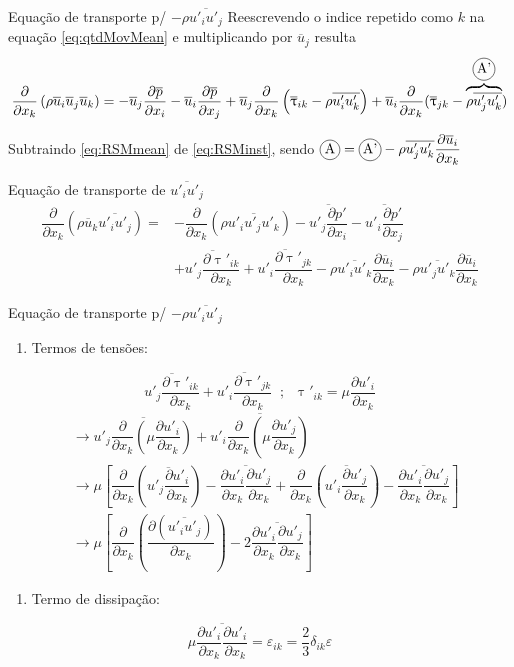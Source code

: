 \documentclass[10pt]{beamer}
\newcommand{\ddx}[2]{\dfrac{\partial #1}{\partial x_{#2}}}
\newcommand{\ddxp}[2]{\dfrac{\partial }{\partial x_{#2}}\left(#1\right)}
\newcommand{\m}[1]{\overline{#1}}
\newcommand{\incircle}[1]{{\tikz[baseline=(X.base)] \node(X)[draw, shape=circle, inner sep=0]{\strut #1};}}
\begin{document}
\begin{frame}{Equação de transporte p/ $ -\rho \m{u'_i u'_j} $}
	Reescrevendo o indice repetido como $k$ na equação \ref{eq:qtdMovMean} e multiplicando por $ \m{u}_j $ resulta
	\begin{equation}\label{eq:RSMmean}
	\ddxp{\rho \m{u}_i \m{u}_j \m{u}_k}{k} = - \m{u}_j \ddx{\m{p}}{i} - \m{u}_i \ddx{\m{p}}{j} + \m{u}_j \ddxp{\m{\uptau}_{ik} - \rho\m{u'_iu'_k}}{k} + \m{u}_i \ddx{}{k}(\m{\uptau}_{jk} - \overbrace{\rho\m{u'_ju'_k}}^{\incircle{A'}})
	\end{equation}
	
	Subtraindo \ref{eq:RSMmean} de \ref{eq:RSMinst}, sendo $\incircle{A} = \incircle{A'} - \rho \m{u'_ju'_k}\ddx{\m{u}_i}{k}$
	
	\begin{block}{Equação de transporte de $ \m{u'_i u'_j} $}
		\begin{align}\label{eq:uiuj}
	\ddxp{\rho \m{u}_k \m{u'_i u'_j}}{k} = &- \ddxp{\rho \m{u'_iu'_ju'_k}}{k} - \m{u'_j\ddx{p'}{i}} - \m{u'_i\ddx{p'}{j}} \nonumber \\
	&+ \m{u'_j\ddx{\uptau'_{ik}}{k}} + \m{u'_i\ddx{\uptau'_{jk}}{k}}
	- \rho \m{u'_i u'_k} \ddx{\m{u}_i}{k} - \rho \m{u'_j u'_k} \ddx{\m{u}_i}{k} 
	\end{align}
	\end{block}
		
\end{frame}

\begin{frame}{Equação de transporte p/ $ -\rho \m{u'_i u'_j} $}
	
	\begin{enumerate}[$\bullet$]
		\item Termos de tensões:
	\end{enumerate}
	
	\begin{equation*}
	\m{u'_j\ddx{\uptau'_{ik}}{k}} + \m{u'_i\ddx{\uptau'_{jk}}{k}} \;\;;\;\; \uptau'_{ik} = \mu \ddx{u'_i}{k}
	\end{equation*}
	\begin{align*}
	&\rightarrow \m{u'_j\ddxp{\mu \ddx{u'_i}{k}}{k}} + \m{u'_i\ddxp{\mu \ddx{u'_j}{k}}{k}} \\
	&\rightarrow \mu \left[ \ddxp{\m{u'_j \ddx{u'_i}{k}}}{k} - \m{\ddx{u'_i}{k}\ddx{u'_j}{k}} + \ddxp{\m{u'_i \ddx{u'_j}{k}}}{k} - \m{\ddx{u'_i}{k}\ddx{u'_j}{k}} \right] \\
	&\rightarrow \mu \left[ \ddxp{\ddx{(\m{u'_iu'_j})}{k}}{k} - 2 \m{\ddx{u'_i}{k}\ddx{u'_j}{k}} \right]
	\end{align*}
	
	\begin{enumerate}[$\bullet$]
		\item Termo de dissipação:
	\end{enumerate}
	\begin{equation*}
	\mu \m{\ddx{u'_i}{k}\ddx{u'_i}{k}} = \varepsilon_{ik} = \dfrac{2}{3} \delta_{ik}\varepsilon
	\end{equation*}
	
	
\end{frame}
\end{document}
